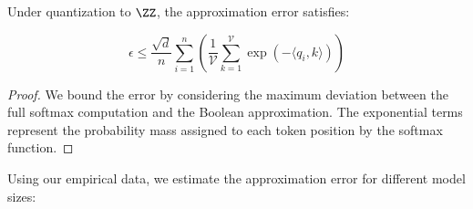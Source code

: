 \begin{theorem}






Under quantization to $\ZZ$, the approximation error satisfies:






$$






\epsilon \leq \frac{\sqrt{d}}{n} \sum_{i=1}^n \left( \frac{1}{\mathcal{V}} \sum_{k=1}^{\mathcal{V}} \exp(-\langle q_i, k \rangle) \right)






$$






\end{theorem}













\begin{proof}






We bound the error by considering the maximum deviation between the full softmax computation and the Boolean approximation. The exponential terms represent the probability mass assigned to each token position by the softmax function.






\end{proof}













Using our empirical data, we estimate the approximation error for different model sizes:













